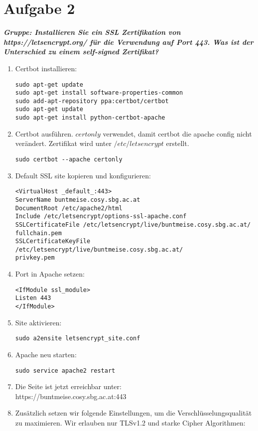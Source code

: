 \documentclass[12pt, a4paper]{report}
\begin{document}
\section*{Aufgabe 2}
\textbf{\textit{Gruppe: Installieren Sie ein SSL Zertifikation von https://letsencrypt.org/ für die
Verwendung auf Port 443. Was ist der Unterschied zu einem self-signed Zertifikat?}}\\
\begin{enumerate}
	\item Certbot installieren:
	\begin{verbatim}
sudo apt-get update
sudo apt-get install software-properties-common
sudo add-apt-repository ppa:certbot/certbot
sudo apt-get update
sudo apt-get install python-certbot-apache
	\end{verbatim}
	\item Certbot ausführen. $certonly$ verwendet, damit certbot die apache config nicht verändert. Zertifikat wird unter $/etc/letsencrypt$ erstellt.
	\begin{verbatim}
sudo certbot --apache certonly
	\end{verbatim}
	\item Default SSL site kopieren und konfigurieren:
	\begin{verbatim}
<VirtualHost _default_:443>
ServerName buntmeise.cosy.sbg.ac.at
DocumentRoot /etc/apache2/html
Include /etc/letsencrypt/options-ssl-apache.conf
SSLCertificateFile /etc/letsencrypt/live/buntmeise.cosy.sbg.ac.at/
fullchain.pem
SSLCertificateKeyFile /etc/letsencrypt/live/buntmeise.cosy.sbg.ac.at/
privkey.pem
	\end{verbatim}
	\item Port in Apache setzen:
	\begin{verbatim}
<IfModule ssl_module>
Listen 443
</IfModule>
	\end{verbatim}
	\item Site aktivieren:
	\begin{verbatim}
sudo a2ensite letsencrypt_site.conf
	\end{verbatim}
	\item Apache neu starten:
	\begin{verbatim}
sudo service apache2 restart
	\end{verbatim}
	\item Die Seite ist jetzt erreichbar unter:\\
	https://buntmeise.cosy.sbg.ac.at:443
	\item Zusätzlich setzen wir folgende Einstellungen, um die Verschlüsselungsqualität zu maximieren. Wir erlauben nur TLSv1.2 und starke Cipher Algorithmen:

\end{enumerate}
\end{document}
